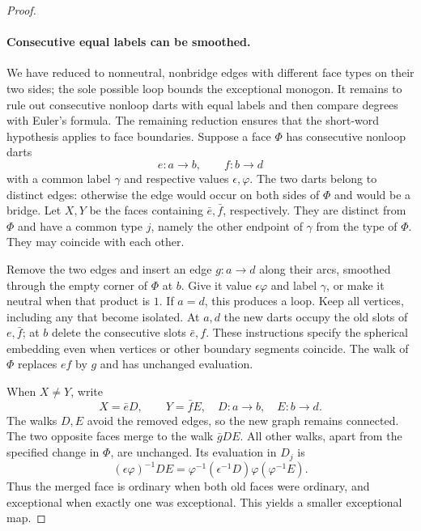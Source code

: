 \begin{proof}
\paragraph{Consecutive equal labels can be smoothed.}
We have reduced to nonneutral, nonbridge edges with different face types
on their two sides; the sole possible loop bounds the exceptional monogon.
It remains to rule out consecutive nonloop darts with equal labels and
then compare degrees with Euler's formula.
The remaining reduction ensures that the short-word hypothesis applies
to face boundaries.  Suppose a face $\Phi$ has consecutive nonloop
darts
\[
 e:a\longrightarrow b,\qquad f:b\longrightarrow d
\]
with a common label $\gamma$ and respective values $\epsilon,\varphi$.
The two darts belong to distinct edges: otherwise the edge would occur
on both sides of $\Phi$ and would be a bridge.  Let $X,Y$ be the faces
containing $\bar e,\bar f$, respectively.  They are distinct from
$\Phi$ and have a common type $j$, namely the other endpoint of
$\gamma$ from the type of $\Phi$.  They may coincide with each other.

Remove the two edges and insert an edge $g:a\to d$ along their arcs,
smoothed through the empty corner of $\Phi$ at $b$.  Give it value
$\epsilon\varphi$ and label $\gamma$, or make it neutral when that
product is $1$.  If $a=d$, this produces a loop.  Keep all vertices,
including any that become isolated.  At $a,d$ the new darts occupy the
old slots of $e,\bar f$; at $b$ delete the consecutive slots
$\bar e,f$.  These instructions specify the spherical embedding even
when vertices or other boundary segments coincide.  The walk of
$\Phi$ replaces $ef$ by $g$ and has unchanged evaluation.



When $X\neq Y$, write
\[
 X=\bar eD,\qquad Y=\bar fE,
 \quad D:a\to b,\quad E:b\to d.
\]
The walks $D,E$ avoid the removed edges, so the new graph remains
connected.  The two opposite faces merge to the walk $\bar gDE$.
All other walks, apart from the specified change in $\Phi$, are
unchanged.  Its evaluation in $D_j$ is
\begin{equation}\label{eq:gluing-smooth-merge}
 (\epsilon\varphi)^{-1}DE
 =\varphi^{-1}(\epsilon^{-1}D)\varphi(\varphi^{-1}E).
\end{equation}
Thus the merged face is ordinary when both old faces were ordinary,
and exceptional when exactly one was exceptional.  This yields a
smaller exceptional map.


\end{proof}
